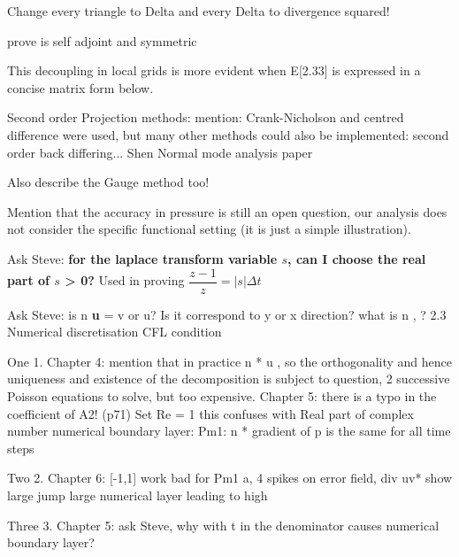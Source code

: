 Change every triangle to Delta and every Delta to divergence squared!

prove  is self adjoint and symmetric

This decoupling in local grids is more evident when E[2.33] is expressed in a concise matrix form below.

Second order Projection methods: mention: Crank-Nicholson and centred difference were used, but many other methods could also be implemented: second order back differing... Shen Normal mode analysis paper

Also describe the Gauge method too!

Mention that the accuracy in pressure is still an open question, our analysis does not consider the specific functional setting (it is just a simple illustration).

Ask Steve: \textbf{for the laplace transform variable $s$, can I choose the real part of $s$ > 0?}
Used in proving $\dfrac{z - 1}{z} = |s| \Delta t$

Ask Steve: is n \cdot \textbf{u} = v or u? Is it correspond to y or x direction?
what is n \cdot \nabla \phi, ?
2.3 Numerical discretisation
CFL condition

One 1. Chapter 4: mention that in practice n * u , so the orthogonality and hence uniqueness and existence of the decomposition is subject to question, 2 successive Poisson equations to solve, but too expensive. 
Chapter 5: there is a typo in the coefficient of A2! (p71)
Set Re = 1 this confuses with Real part of complex number
numerical boundary layer: Pm1: n * gradient of p is the same for all time steps

Two 2. Chapter 6: [-1,1] work bad for Pm1 a, 4 spikes on error field, div uv* show large jump large numerical layer leading to high 

Three 3. Chapter 5: ask Steve, why \gamma with \Delta t in the denominator causes numerical boundary layer?